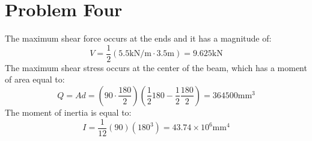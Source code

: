 \documentclass{article}
\begin{document}
\begin{center}
\end{center}
\newpage
\section{Problem Four}
The maximum shear force occurs at the ends and it has a magnitude of:
\begin{equation}
  V = \frac{1}{2}\left(5.5\si{\kilo\newton\per\meter}\cdot 3.5\si{\meter}\right) = 9.625\si{\kilo\newton}
  \label{eq:}
\end{equation}
The maximum shear stress occurs at the center of the beam, which has a moment of area equal to:
\begin{equation}
  Q = Ad = \left(90 \cdot \frac{180}{2}\right)\left(\frac{1}{2}180-\frac{1}{2}\frac{180}{2}\right) = 364500 \si{\milli\meter\cubed}
  \label{eq:allan fan club}
\end{equation}
The moment of inertia is equal to:
\begin{equation}
  I = \frac{1}{12}(90)(180^3) = 43.74 \times 10^6 \si{\milli\meter\tothe{4}}
  \label{eq:}
\end{equation}
\end{document}
